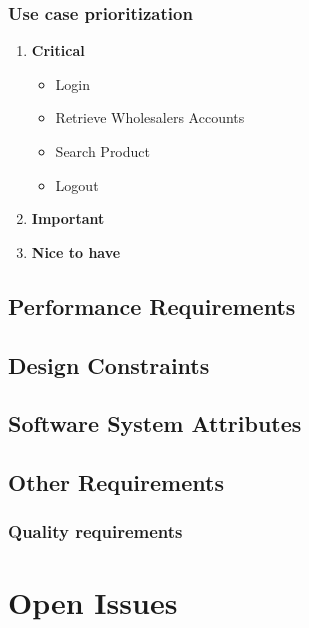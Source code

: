 \documentclass[a4paper,10pt]{article}
\begin{document}
	\subsubsection{Use case prioritization} 
		\begin{enumerate} 
		\item \textbf{Critical} 
			\begin{itemize} 
				\item Login
				\item Retrieve Wholesalers Accounts 
				\item Search Product 
				\item Logout
			\end{itemize} 
		\item \textbf{Important} 

		\item \textbf{Nice to have} 
		\end{enumerate} 

	\subsection{Performance Requirements}

	\subsection{Design Constraints}

	\subsection{Software System Attributes}

	\subsection{Other Requirements}

\subsubsection{Quality requirements}

\clearpage

\section{Open Issues}
\end{document}
